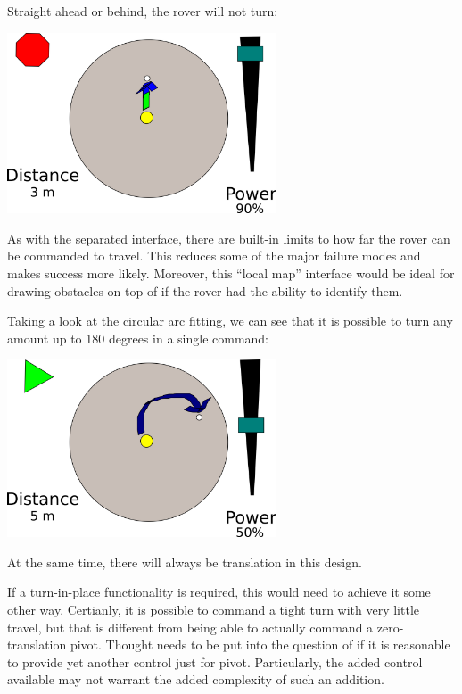 \documentclass[letterpaper,10pt]{article}
\begin{document}
    Straight ahead or behind, the rover will not turn:
    
    \includegraphics[width=8cm]{basic_arc_forward_running}
    
    As with the separated interface, there are built-in limits to how far the rover can be commanded to travel.  This reduces some of the major failure modes and makes success more likely.  Moreover, this ``local map'' interface would be ideal for drawing obstacles on top of if the rover had the ability to identify them.
    
    Taking a look at the circular arc fitting, we can see that it is possible to turn any amount up to 180 degrees in a single command:
    
    \includegraphics[width=8cm]{basic_arc_turning}
    
    At the same time, there will always be translation in this design.
    
    
    
    If a turn-in-place functionality is required, this would need to achieve it some other way.  Certianly, it is possible to command a tight turn with very little travel, but that is different from being able to actually command a zero-translation pivot.  Thought needs to be put into the question of if it is reasonable to provide yet another control just for pivot.  Particularly, the added control available may not warrant the added complexity of such an addition.
    
\end{document}
